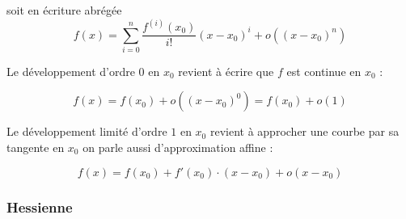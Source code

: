 soit en écriture abrégée
$$
f(x)=\sum _{{i=0}}^{n}{\frac  {f^{{(i)}}(x_{0})}{i!}}(x-x_{0})^{i}+o((x-x_{0})^{n})
$$

Le développement d'ordre $0$ en $x_0$ revient à écrire que $f$ est continue en $x_0$ :

$$
{\displaystyle f(x)=f(x_{0})+o((x-x_{0})^{0})=f(x_{0})+o(1)}
$$

Le développement limité d'ordre $1$  en $x_0$ revient à approcher une courbe par sa tangente en $x_0$ on parle aussi d'approximation affine :

\begin{equation}\label{eq:dev_lim_cont}
f(x)=f(x_{0})+f'(x_{0})\cdot (x-x_{0})+o(x-x_{0})
\end{equation}












\subsubsection{\textbf{Hessienne}}
